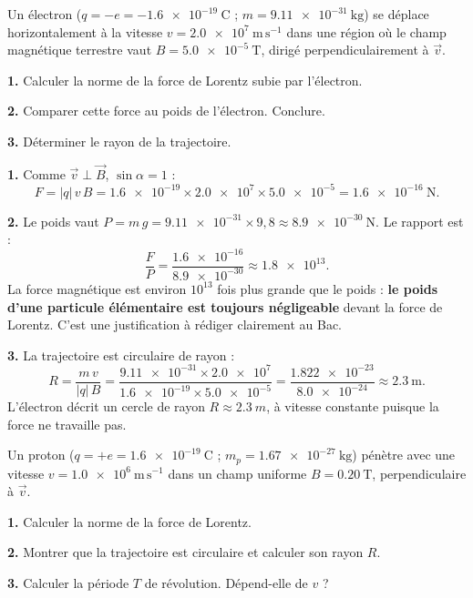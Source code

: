 \documentclass[11pt]{article}
\begin{document}
\begin{exoresolu}
Un électron ($q = -e = \num{-1,6e-19}\ \mathrm{C}$ ; $m = \num{9,11e-31}\ \mathrm{kg}$) se déplace horizontalement à la vitesse $v = \num{2,0e7}\ \mathrm{m\,s^{-1}}$ dans une région où le champ magnétique terrestre vaut $B = \num{5,0e-5}\ \mathrm{T}$, dirigé perpendiculairement à $\vec{v}$.

\textbf{1.} Calculer la norme de la force de Lorentz subie par l'électron.

\textbf{2.} Comparer cette force au poids de l'électron. Conclure.

\textbf{3.} Déterminer le rayon de la trajectoire.

\tcblower

\textbf{1.} Comme $\vec{v}\perp\vec{B}$, $\sin\alpha = 1$ :
\[ F = |q|\,v\,B = \num{1,6e-19}\times\num{2,0e7}\times\num{5,0e-5} = \SI{1,6e-16}{\newton}. \]

\textbf{2.} Le poids vaut $P = m\,g = \num{9,11e-31}\times 9,8 \approx \SI{8,9e-30}{\newton}$. Le rapport est :
\[ \frac{F}{P} = \frac{\num{1,6e-16}}{\num{8,9e-30}} \approx \num{1,8e13}. \]
La force magnétique est environ $10^{13}$ fois plus grande que le poids : \textbf{le poids d'une particule élémentaire est toujours négligeable} devant la force de Lorentz. C'est une justification à rédiger clairement au Bac.

\textbf{3.} La trajectoire est circulaire de rayon :
\[ R = \frac{m\,v}{|q|\,B} = \frac{\num{9,11e-31}\times\num{2,0e7}}{\num{1,6e-19}\times\num{5,0e-5}} = \frac{\num{1,822e-23}}{\num{8,0e-24}} \approx \num{2,3}\ \mathrm{m}. \]
L'électron décrit un cercle de rayon $R \approx \SI{2,3}{m}$, à vitesse constante puisque la force ne travaille pas.
\end{exoresolu}

\begin{exercice}
Un proton ($q = +e = \num{1,6e-19}\ \mathrm{C}$ ; $m_p = \num{1,67e-27}\ \mathrm{kg}$) pénètre avec une vitesse $v = \num{1,0e6}\ \mathrm{m\,s^{-1}}$ dans un champ uniforme $B = \num{0,20}\ \mathrm{T}$, perpendiculaire à $\vec{v}$.

\textbf{1.} Calculer la norme de la force de Lorentz.

\textbf{2.} Montrer que la trajectoire est circulaire et calculer son rayon $R$.

\textbf{3.} Calculer la période $T$ de révolution. Dépend-elle de $v$ ?
\end{exercice}
\end{document}

